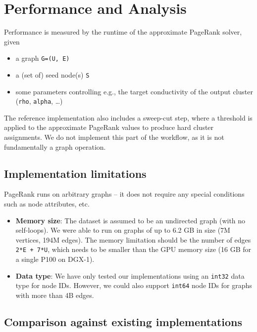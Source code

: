 \documentclass[10pt,oneside]{memoir}
\providecommand{\tightlist}{%
  \setlength{\itemsep}{0pt}\setlength{\parskip}{0pt}}
\begin{document}
\hypertarget{performance-and-analysis-5}{%
\section{Performance and Analysis}\label{performance-and-analysis-5}}

Performance is measured by the runtime of the approximate PageRank
solver, given

\begin{itemize}
\tightlist
\item
  a graph \texttt{G=(U,\ E)}
\item
  a (set of) seed node(s) \texttt{S}
\item
  some parameters controlling e.g., the target conductivity of the
  output cluster (\texttt{rho}, \texttt{alpha}, \ldots{})
\end{itemize}

The reference implementation also includes a sweep-cut step, where a
threshold is applied to the approximate PageRank values to produce hard
cluster assignments. We do not implement this part of the workflow, as
it is not fundamentally a graph operation.

\hypertarget{implementation-limitations-5}{%
\subsection{Implementation
limitations}\label{implementation-limitations-5}}

PageRank runs on arbitrary graphs -- it does not require any special
conditions such as node attributes, etc.

\begin{itemize}
\item
  \textbf{Memory size}: The dataset is assumed to be an undirected graph
  (with no self-loops). We were able to run on graphs of up to 6.2 GB in
  size (7M vertices, 194M edges). The memory limitation should be the
  number of edges
  \texttt{2*\textbar{}E\textbar{}\ +\ 7*\textbar{}U\textbar{}}, which
  needs to be smaller than the GPU memory size (16 GB for a single P100
  on DGX-1).
\item
  \textbf{Data type}: We have only tested our implementations using an
  \texttt{int32} data type for node IDs. However, we could also support
  \texttt{int64} node IDs for graphs with more than 4B edges.
\end{itemize}

\hypertarget{comparison-against-existing-implementations-5}{%
\subsection{Comparison against existing
implementations}\label{comparison-against-existing-implementations-5}}
\end{document}
